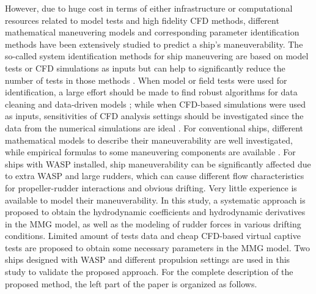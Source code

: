 However, due to huge cost in terms of either infrastructure or computational resources related to model tests and high fidelity CFD methods, different mathematical maneuvering models and corresponding parameter identification methods have been extensively studied to predict a ship’s maneuverability. The so-called system identification methods for ship maneuvering are based on model tests or CFD simulations as inputs but can help to significantly reduce the number of tests in those methods \citep{lokukalugep.pereraSystemIdentificationVessel2016,alexanderssonSystemIdentificationPhysicsinformed2024b}. When model or field tests were used for identification, a large effort should be made to find robust algorithms for data cleaning and data-driven models \citep{revestidoherreroTwostepIdentificationNonlinear2012,alexanderssonSystemIdentificationVessel2022,duShipManeuveringPrediction2022}; while when CFD-based simulations were used as inputs, sensitivities of CFD analysis settings should be investigated since the data from the numerical simulations are ideal \citep{liuPredictionsShipManeuverability2018}.
For conventional ships, different mathematical models to describe their maneuverability are well investigated, while empirical formulas to some maneuvering components are available \citep{yasukawaIntroductionMMGStandard2015}. For ships with WASP installed, ship maneuverability can be significantly affected due to extra WASP and large rudders, which can cause different flow characteristics for propeller-rudder interactions and obvious drifting. Very little experience is available to model their maneuverability. In this study, a systematic approach is proposed to obtain the hydrodynamic coefficients and hydrodynamic derivatives in the MMG model, as well as the modeling of rudder forces in various drifting conditions. Limited amount of tests data and cheap CFD-based virtual captive tests are proposed to obtain some necessary parameters in the MMG model. Two ships designed with WASP and different propulsion settings are used in this study to validate the proposed approach. For the complete description of the proposed method, the left part of the paper is organized as follows. 

